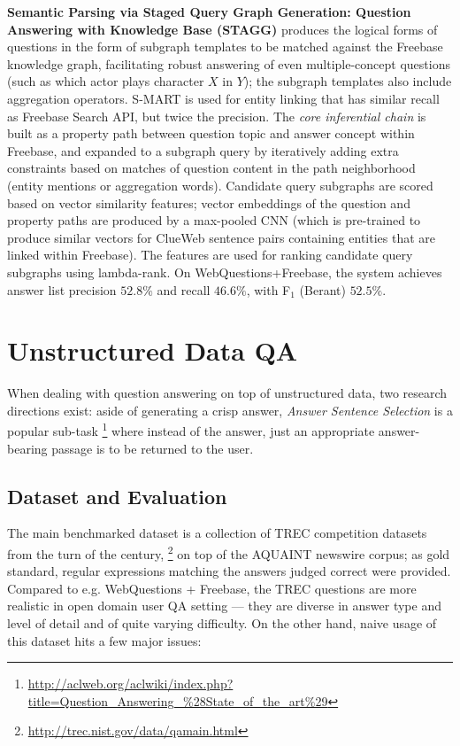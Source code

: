 \textbf{Semantic Parsing via Staged Query Graph Generation: Question Answering with Knowledge Base (STAGG)} \citep{STAGG}
	produces the logical forms of questions in the form of subgraph templates
	to be matched against the Freebase knowledge graph,
	facilitating robust answering of even multiple-concept questions
	(such as which actor plays character $X$ in $Y$);
	the subgraph templates also include aggregation operators.
	S-MART \cite{ELS-MART} is used for entity linking
	that has similar recall as Freebase Search API, but twice the precision.
	The \textit{core inferential chain} is built as a property path
	between question topic and answer concept within Freebase,
	and expanded to a subgraph query by iteratively adding extra
	constraints based on matches of question content in the path
	neighborhood (entity mentions or aggregation words).
	Candidate query subgraphs are scored based on vector similarity
	features; vector embeddings of the question and property paths
	are produced by a max-pooled CNN (which is pre-trained to produce
	similar vectors for ClueWeb sentence pairs containing entities that
	are linked within Freebase).
	The features are used for ranking candidate query subgraphs using lambda-rank.
	On WebQuestions+Freebase, the system achieves answer list
	precision $52.8\%$ and recall $46.6\%$, with F$_1$ (Berant)
	$52.5\%$.



\section{Unstructured Data QA}
\label{sec:unstructured}

When dealing with question answering on top of unstructured data,
two research directions exist: aside of generating a crisp answer,
\textit{Answer Sentence Selection} is a popular sub-task%
\footnote{\url{http://aclweb.org/aclwiki/index.php?title=Question_Answering_\%28State_of_the_art\%29}}
where instead of the answer, just an appropriate answer-bearing passage
is to be returned to the user.

\subsection{Dataset and Evaluation}

The main benchmarked dataset is a collection of TREC competition datasets
from the turn of the century,%
\footnote{\url{http://trec.nist.gov/data/qamain.html}}
on top of the AQUAINT newswire corpus;
as gold standard,
regular expressions matching the answers judged correct were provided.
Compared to e.g. WebQuestions + Freebase, the TREC questions
are more realistic in open domain user QA setting --- they are diverse
in answer type and level of detail and of quite varying difficulty.
On the other hand, naive usage of this dataset hits a few major issues:

